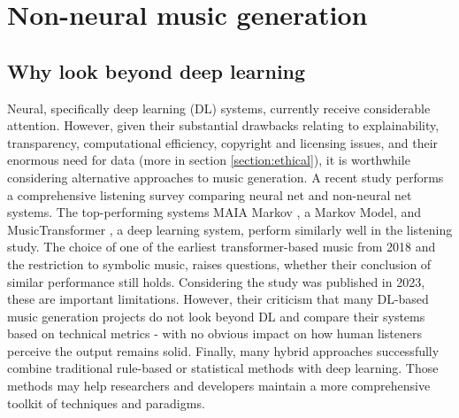 \section{Non-neural music generation} \label{section:non_neural_generation}

\subsection{Why look beyond deep learning}
Neural, specifically deep learning (DL) systems, currently receive considerable attention. However, given their substantial drawbacks relating to explainability, transparency, computational efficiency, copyright and licensing issues, and their enormous need for data (more in section \ref{section:ethical}), it is worthwhile considering alternative approaches to music generation. A recent study \cite{Yin_Reuben_Stepney_Collins_2023} performs a comprehensive listening survey comparing neural net and non-neural net systems. The top-performing systems MAIA Markov \cite{Collins_Laney_2017}, a Markov Model, and MusicTransformer \cite{Huang_Vaswani_Uszkoreit_Shazeer_Simon_Hawthorne_Dai_Hoffman_Dinculescu_Eck_2018}, a deep learning system, perform similarly well in the listening study. The choice of one of the earliest transformer-based music from 2018 \cite{Huang_Vaswani_Uszkoreit_Shazeer_Simon_Hawthorne_Dai_Hoffman_Dinculescu_Eck_2018} and the restriction to symbolic music, raises questions, whether their conclusion of similar performance still holds. Considering the study was published in 2023, these are important limitations. However, their criticism that many DL-based music generation projects do not look beyond DL and compare their systems based on technical metrics - with no obvious impact on how human listeners perceive the output remains solid. Finally, many hybrid approaches successfully combine traditional rule-based or statistical methods with deep learning. Those methods may help researchers and developers maintain a more comprehensive toolkit of techniques and paradigms. 

